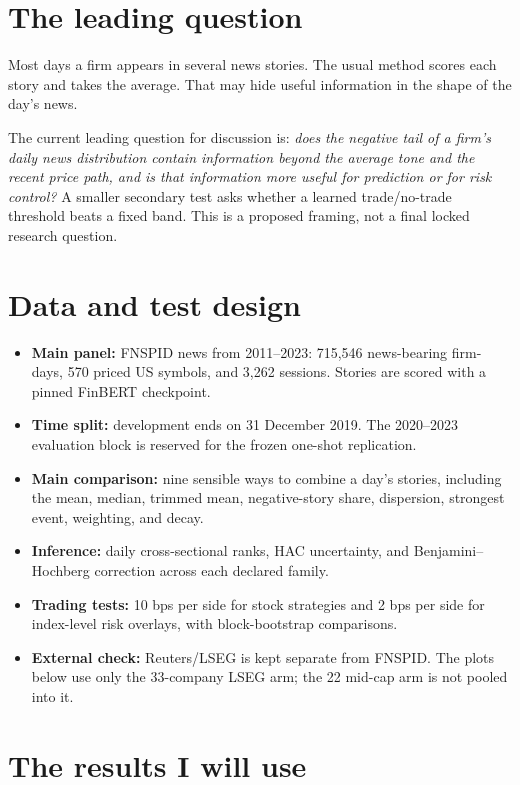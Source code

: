 \documentclass[11pt,a4paper]{article}
\begin{document}
\section*{The leading question}

Most days a firm appears in several news stories. The usual method scores each story and takes the average. That may hide useful information in the shape of the day's news.

The current leading question for discussion is: \emph{does the negative tail of a firm's daily news distribution contain information beyond the average tone and the recent price path, and is that information more useful for prediction or for risk control?} A smaller secondary test asks whether a learned trade/no-trade threshold beats a fixed band. This is a proposed framing, not a final locked research question.

\section*{Data and test design}

\begin{itemize}
\item \textbf{Main panel:} FNSPID news from 2011--2023: 715{,}546 news-bearing firm-days, 570 priced US symbols, and 3{,}262 sessions. Stories are scored with a pinned FinBERT checkpoint.
\item \textbf{Time split:} development ends on 31 December 2019. The 2020--2023 evaluation block is reserved for the frozen one-shot replication.
\item \textbf{Main comparison:} nine sensible ways to combine a day's stories, including the mean, median, trimmed mean, negative-story share, dispersion, strongest event, weighting, and decay.
\item \textbf{Inference:} daily cross-sectional ranks, HAC uncertainty, and Benjamini--Hochberg correction across each declared family.
\item \textbf{Trading tests:} 10 bps per side for stock strategies and 2 bps per side for index-level risk overlays, with block-bootstrap comparisons.
\item \textbf{External check:} Reuters/LSEG is kept separate from FNSPID. The plots below use only the 33-company LSEG arm; the 22 mid-cap arm is not pooled into it.
\end{itemize}

\section*{The results I will use}
\end{document}
